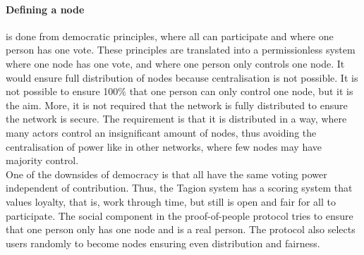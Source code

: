 \paragraph{Defining a node} is done from democratic principles, where all can participate and where one person has one vote. These principles are translated into a permissionless system where one node has one vote, and where one person only controls one node. It would ensure full distribution of nodes because centralisation is not possible. It is not possible to ensure 100\% that one person can only control one node, but it is the aim. More, it is not required that the network is fully distributed to ensure the network is secure. The requirement is that it is distributed in a way, where many actors control an insignificant amount of nodes, thus avoiding the centralisation of power like in other networks, where few nodes may have majority control. \\
One of the downsides of democracy is that all have the same voting power independent of contribution. Thus, the Tagion system has a scoring system that values loyalty, that is, work through time, but still is open and fair for all to participate. The social component in the proof-of-people protocol tries to ensure that one person only has one node and is a real person. The protocol also selects users randomly to become nodes ensuring even distribution and fairness.  

